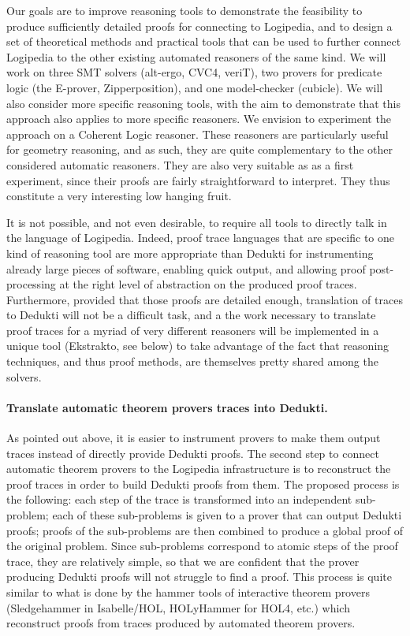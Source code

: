Our goals are to improve reasoning tools to demonstrate the
feasibility to produce sufficiently detailed proofs for connecting to
Logipedia, and to design a set of theoretical methods and practical
tools that can be used to further connect Logipedia to the other
existing automated reasoners of the same kind.  We will work on three
SMT solvers (alt-ergo, CVC4, veriT), two provers for predicate logic
(the E-prover, Zipperposition), and one model-checker (cubicle).  We
will also consider more specific reasoning tools, with the aim to
demonstrate that this approach also applies to more specific
reasoners.  We envision to experiment the approach on a Coherent Logic
reasoner.  These reasoners are particularly useful for geometry
reasoning, and as such, they are quite complementary to the other
considered automatic reasoners.  They are also very suitable as as a
first experiment, since their proofs are fairly straightforward to
interpret.  They thus constitute a very interesting low hanging fruit.
  
It is not possible, and not even desirable, to require all tools to
directly talk in the language of Logipedia.  Indeed, proof trace
languages that are specific to one kind of reasoning tool are more
appropriate than Dedukti for instrumenting already large pieces of
software, enabling quick output, and allowing proof post-processing at
the right level of abstraction on the produced proof traces.
Furthermore, provided that those proofs are detailed enough,
translation of traces to Dedukti will not be a difficult task, and a
the work necessary to translate proof traces for a myriad of very
different reasoners will be implemented in a unique tool (Ekstrakto,
see below) to take advantage of the fact that reasoning techniques,
and thus proof methods, are themselves pretty shared among the
solvers.

\paragraph*{Translate automatic theorem provers traces into Dedukti.}
As pointed out above, it is easier to instrument provers to make them
output traces instead of directly provide Dedukti proofs. The second
step to connect automatic theorem provers to the Logipedia
infrastructure is to reconstruct the proof traces in order to build
Dedukti proofs from them. The proposed process is the following: each
step of the trace is transformed into an independent sub-problem; each
of these sub-problems is given to a prover that can output Dedukti
proofs; proofs of the sub-problems are then combined to produce a
global proof of the original problem.  Since sub-problems correspond to
atomic steps of the proof trace, they are relatively simple, so that
we are confident that the prover producing Dedukti proofs will not
struggle to find a proof. This process is quite similar to what is
done by the hammer tools of interactive theorem provers (Sledgehammer
in Isabelle/HOL, HOLyHammer for HOL4, etc.) which reconstruct proofs
from traces produced by automated theorem provers.

